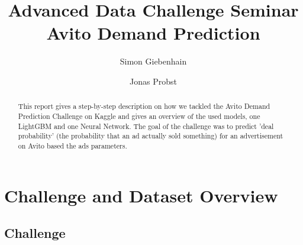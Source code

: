 \documentclass[runningheads]{llncs}
\begin{document}
%
\title{Advanced Data Challenge Seminar\\
		Avito Demand Prediction}
%

%
\author{Simon Giebenhain \and Jonas Probst}
%

%
%
\maketitle              %
%
\begin{abstract}
This report gives a step-by-step description on how we tackled the Avito Demand Prediction Challenge on Kaggle and gives an overview of the used models, one LightGBM and one Neural Network. The goal of the challenge was to predict 'deal probability' (the probability that an ad actually sold something) for an advertisement on Avito based the ads parameters. 

\end{abstract}
%
%
%
	\section{Challenge and Dataset Overview}
\subsection{Challenge}
\end{document}
